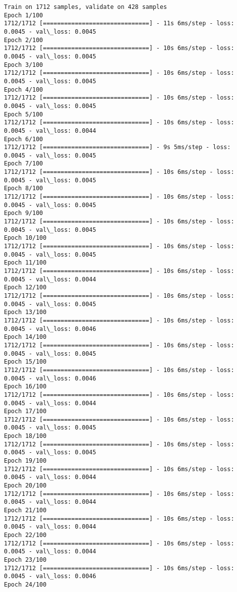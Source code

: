 \documentclass[11pt]{article}
\begin{document}
    \begin{Verbatim}[commandchars=\\\{\}]
Train on 1712 samples, validate on 428 samples
Epoch 1/100
1712/1712 [==============================] - 11s 6ms/step - loss: 0.0045 - val\_loss: 0.0045
Epoch 2/100
1712/1712 [==============================] - 10s 6ms/step - loss: 0.0045 - val\_loss: 0.0045
Epoch 3/100
1712/1712 [==============================] - 10s 6ms/step - loss: 0.0045 - val\_loss: 0.0045
Epoch 4/100
1712/1712 [==============================] - 10s 6ms/step - loss: 0.0045 - val\_loss: 0.0045
Epoch 5/100
1712/1712 [==============================] - 10s 6ms/step - loss: 0.0045 - val\_loss: 0.0044
Epoch 6/100
1712/1712 [==============================] - 9s 5ms/step - loss: 0.0045 - val\_loss: 0.0045
Epoch 7/100
1712/1712 [==============================] - 10s 6ms/step - loss: 0.0045 - val\_loss: 0.0045
Epoch 8/100
1712/1712 [==============================] - 10s 6ms/step - loss: 0.0045 - val\_loss: 0.0045
Epoch 9/100
1712/1712 [==============================] - 10s 6ms/step - loss: 0.0045 - val\_loss: 0.0045
Epoch 10/100
1712/1712 [==============================] - 10s 6ms/step - loss: 0.0045 - val\_loss: 0.0045
Epoch 11/100
1712/1712 [==============================] - 10s 6ms/step - loss: 0.0045 - val\_loss: 0.0044
Epoch 12/100
1712/1712 [==============================] - 10s 6ms/step - loss: 0.0045 - val\_loss: 0.0045
Epoch 13/100
1712/1712 [==============================] - 10s 6ms/step - loss: 0.0045 - val\_loss: 0.0046
Epoch 14/100
1712/1712 [==============================] - 10s 6ms/step - loss: 0.0045 - val\_loss: 0.0045
Epoch 15/100
1712/1712 [==============================] - 10s 6ms/step - loss: 0.0045 - val\_loss: 0.0046
Epoch 16/100
1712/1712 [==============================] - 10s 6ms/step - loss: 0.0045 - val\_loss: 0.0044
Epoch 17/100
1712/1712 [==============================] - 10s 6ms/step - loss: 0.0045 - val\_loss: 0.0045
Epoch 18/100
1712/1712 [==============================] - 10s 6ms/step - loss: 0.0045 - val\_loss: 0.0045
Epoch 19/100
1712/1712 [==============================] - 10s 6ms/step - loss: 0.0045 - val\_loss: 0.0044
Epoch 20/100
1712/1712 [==============================] - 10s 6ms/step - loss: 0.0045 - val\_loss: 0.0044
Epoch 21/100
1712/1712 [==============================] - 10s 6ms/step - loss: 0.0045 - val\_loss: 0.0044
Epoch 22/100
1712/1712 [==============================] - 10s 6ms/step - loss: 0.0045 - val\_loss: 0.0044
Epoch 23/100
1712/1712 [==============================] - 10s 6ms/step - loss: 0.0045 - val\_loss: 0.0046
Epoch 24/100

\end{Verbatim}
\end{document}
